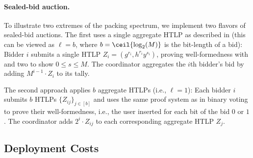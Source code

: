 \paragraph{Sealed-bid auction.}
To illustrate two extremes of the packing spectrum, we implement two flavors of sealed-bid auctions. The first uses a single aggregate HTLP as described in  (this can be viewed as $\ell = b$, where $b = \ceil{\log_2(M)}$ is the bit-length of a bid): Bidder $i$ submits a single HTLP $Z_i = (g^{r_i},h^{r_i} y^{s_i})$, proving well-formedness with \zkpoks and two \zkpopos to show $0\leq s\leq M$. The coordinator aggregates the $i$th bidder's bid by adding $M^{i-1} \cdot Z_i$ to its tally.

The second approach applies $b$ aggregate HTLPs (i.e., $\ell = 1$): Each bidder $i$ submits $b$ HTLPs $\{Z_{ij}\}_{j \in [b]}$ and uses the same proof system as in binary voting to prove their well-formedness, i.e., the user inserted for each bit of the bid $0$ or $1$. The coordinator adds $2^i \cdot Z_{ij}$ to each corresponding aggregate HTLP $Z_j$.%

\subsection{Deployment Costs}\label{sec:cicada_costs}

